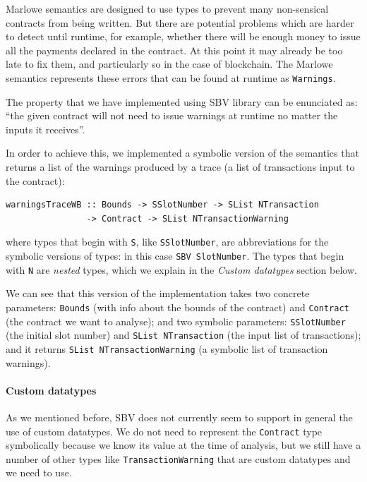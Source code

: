 \documentclass[runningheads]{llncs}
\begin{document}
Marlowe semantics are designed to use types to prevent many non-sensical contracts from being written. But there are potential problems which are harder to detect until runtime, for example, whether there will be enough money to issue all the payments declared in the contract. At this point it may already be too late to fix them, and particularly so in the case of blockchain. The Marlowe semantics represents these errors that can be found at runtime as \texttt{Warnings}.

The property that we have implemented using SBV library can be enunciated as: ``the given contract will not need to issue warnings at runtime no matter the inputs it receives''. 

In order to achieve this, we implemented a symbolic version of the semantics that returns a list of the warnings produced by a trace (a list of transactions input to the contract):

\begin{verbatim}
warningsTraceWB :: Bounds -> SSlotNumber -> SList NTransaction
                -> Contract -> SList NTransactionWarning
\end{verbatim}

\noindent
where types that begin with \texttt{S}, like \texttt{SSlotNumber}, are abbreviations for the symbolic versions of types: in this case \texttt{SBV SlotNumber}.
The types that begin with \texttt{N} are \textit{nested} types, which we explain in the \textit{Custom datatypes} section below.

We can see that this version of the implementation takes two concrete parameters: 
\texttt{Bounds} (with info about the bounds of the contract) and \texttt{Contract} (the contract we want to analyse); and two symbolic parameters: \texttt{SSlotNumber} (the initial slot number) and \texttt{SList NTransaction} (the input list of transactions); and it returns \texttt{SList NTransactionWarning} (a symbolic list of transaction warnings).

\paragraph{Custom datatypes}

As we mentioned before, SBV does not currently seem to support in general the use of custom datatypes. We do not need to represent the \texttt{Contract} type symbolically because we know its value at the time of analysis, but we still have a number of other types like \texttt{TransactionWarning} that are custom datatypes and we need to use.
\end{document}
